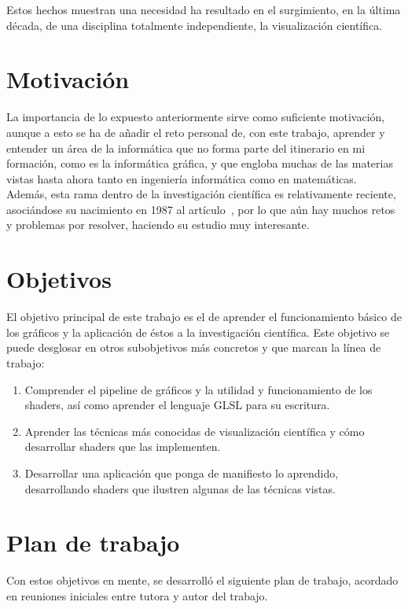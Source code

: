 Estos hechos muestran una necesidad ha resultado en el surgimiento, en la última
década, de una disciplina totalmente independiente, la visualización científica. 

\section{Motivación}
\label{makereference1.1}

La importancia de lo expuesto anteriormente sirve como suficiente motivación,
aunque a esto se ha de añadir el reto personal de, con este trabajo, aprender
y entender un área de la informática que no forma parte del itinerario en mi
formación, como es la informática gráfica, y que engloba muchas de las materias
vistas hasta ahora tanto en ingeniería informática como en matemáticas.\\

Además, esta rama dentro de la investigación científica es relativamente
reciente, asociándose su nacimiento en 1987 al
artículo~\citet{McCormick:1988:VSC:43965.43966}, por lo que aún hay muchos retos
y problemas por resolver, haciendo su estudio muy interesante.

\section{Objetivos}
\label{makereference1.2}

El objetivo principal de este trabajo es el de aprender el funcionamiento básico
de los gráficos y la aplicación de éstos a la investigación científica.
Este objetivo se puede desglosar en otros subobjetivos más concretos y que
marcan la línea de trabajo:
\begin{enumerate}
		\item Comprender el pipeline de gráficos y la utilidad y funcionamiento
				de los shaders, así como aprender el lenguaje GLSL para su
				escritura.
		\item Aprender las técnicas más conocidas de visualización científica y
				cómo desarrollar shaders que las implementen.
		\item Desarrollar una aplicación que ponga de manifiesto lo aprendido,
				desarrollando shaders que ilustren algunas de las técnicas
				vistas.
\end{enumerate}

\section{Plan de trabajo}
\label{makereference1.3}
Con estos objetivos en mente, se desarrolló el siguiente plan de trabajo,
acordado en reuniones iniciales entre tutora y autor del trabajo.

